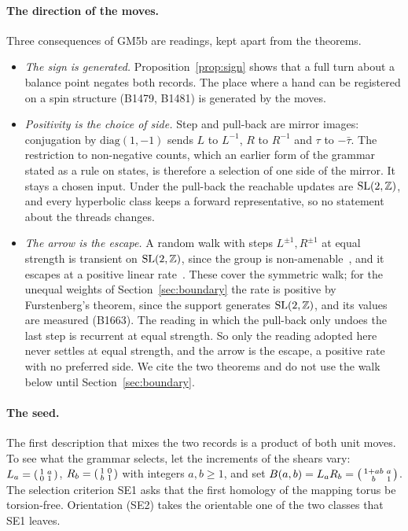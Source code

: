 \paragraph{The direction of the moves.}
Three consequences of GM5b are readings, kept apart from the theorems.
\begin{itemize}
\item \emph{The sign is generated.} Proposition~\ref{prop:sign} shows that a full turn about a balance point negates
  both records. The place where a hand can be registered on a spin structure (B1479, B1481) is generated by the moves.
\item \emph{Positivity is the choice of side.} Step and pull-back are mirror images: conjugation by $\mathrm{diag}(1,-1)$
  sends $L$ to $L^{-1}$, $R$ to $R^{-1}$ and $\tau$ to $-\bar\tau$. The restriction to non-negative counts, which an
  earlier form of the grammar stated as a rule on states, is therefore a selection of one side of the mirror. It stays a
  chosen input. Under the pull-back the reachable updates are $\mathrm{SL}(2,\mathbb{Z})$, and every hyperbolic class keeps a
  forward representative, so no statement about the threads changes.
\item \emph{The arrow is the escape.} A random walk with steps $L^{\pm1},R^{\pm1}$ at equal strength is transient on
  $\mathrm{SL}(2,\mathbb{Z})$, since the group is non-amenable~\cite{Kesten1959}, and it escapes at a positive linear rate~\cite{Furstenberg1963,FurstenbergKesten1960}. These
  cover the symmetric walk; for the unequal weights of Section~\ref{sec:boundary} the rate is positive by Furstenberg's theorem, since the support
  generates $\mathrm{SL}(2,\mathbb{Z})$, and its values are measured (B1663).
  The reading in which the pull-back only undoes the last step is recurrent at equal strength. So only the reading
  adopted here never settles at equal strength, and the arrow is the escape, a positive rate with no preferred side. We cite the two theorems and do not
  use the walk below until Section~\ref{sec:boundary}.
\end{itemize}

\paragraph{The seed.}
The first description that mixes the two records is a product of both unit moves. To see what the grammar selects, let
the increments of the shears vary: $L_a=\begin{psmallmatrix}1&a\\0&1\end{psmallmatrix}$, $R_b=\begin{psmallmatrix}1&0\\b&1\end{psmallmatrix}$ with
integers $a,b\ge1$, and set $B(a,b)=L_aR_b=\begin{psmallmatrix}1+ab&a\\b&1\end{psmallmatrix}$. The selection criterion SE1 asks that
the first homology of the mapping torus be torsion-free. Orientation (SE2) takes the orientable one of the two classes
that SE1 leaves.

